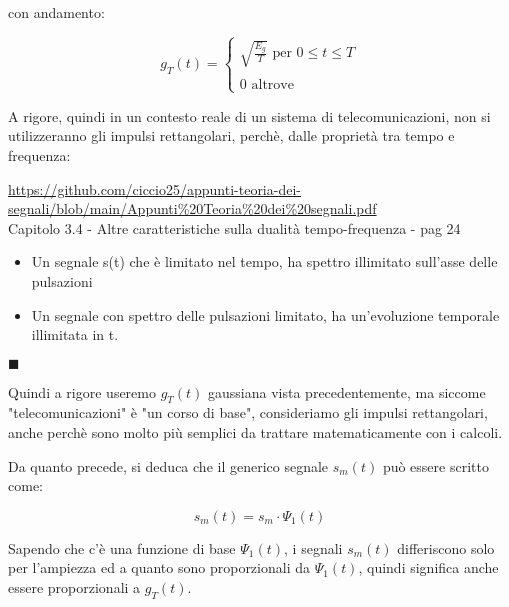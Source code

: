 con andamento: 

{
    \Large 
    \begin{equation}
        g_T (t)
        = 
        \begin{cases}
            \sqrt{\frac{E_g}{T}} \text{ per } 0 \le t \le T 
            \\
            \quad
            \\
            0 \text{ altrove}
        \end{cases}
    \end{equation}
}

\begin{tcolorbox}
    A rigore, quindi in un contesto reale di un sistema di telecomunicazioni, non si utilizzeranno gli impulsi rettangolari, 
    perchè, dalle proprietà tra tempo e frequenza: \newline 

    \url{https://github.com/ciccio25/appunti-teoria-dei-segnali/blob/main/Appunti%20Teoria%20dei%20segnali.pdf} \\
    Capitolo 3.4 - Altre caratteristiche sulla dualità tempo-frequenza - pag 24 \newline 

     \begin{itemize}
        \item Un segnale s(t) che è limitato nel tempo, ha spettro illimitato sull'asse delle pulsazioni 
        \item Un segnale con spettro delle pulsazioni limitato, ha un'evoluzione temporale illimitata in t. \\ 
     \end{itemize}

     $\blacksquare$ \newline 

Quindi a rigore useremo $g_T (t)$ gaussiana vista precedentemente, 
ma siccome "telecomunicazioni" è "un corso di base", consideriamo gli impulsi rettangolari, 
anche perchè sono molto più semplici da trattare matematicamente con i calcoli.

\end{tcolorbox}

Da quanto precede, si deduca che il generico segnale $s_m (t)$ può essere scritto come: 

{
    \Large 
    \begin{equation}
        s_{m} (t) = s_m \cdot \Psi_1(t)
    \end{equation}
}


Sapendo che c'è una funzione di base $\Psi_1 (t)$, 
i segnali $s_m (t)$ differiscono solo per l'ampiezza ed a quanto sono proporzionali da $\Psi_1 (t)$, 
quindi significa anche essere proporzionali a $g_T (t)$. \newline 

